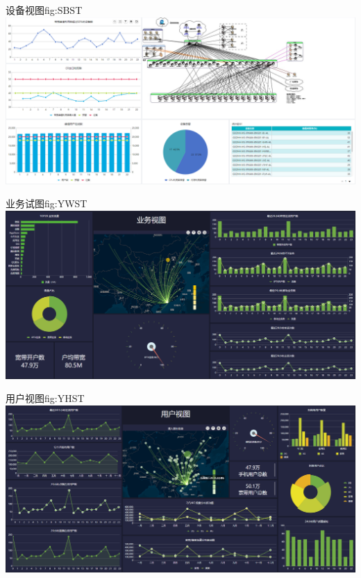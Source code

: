 \documentclass{HustGraduPaper}
\begin{document}
    \begin{generalfig}{设备视图}{fig:SBST} 
        \includegraphics[width = \textwidth]{Figures/SBST.png} 
    \end{generalfig}

    \begin{generalfig}{业务试图}{fig:YWST} 
        \includegraphics[width = \textwidth]{Figures/YWST.png} 
    \end{generalfig}

    \begin{generalfig}{用户视图}{fig:YHST} 
        \includegraphics[width = \textwidth]{Figures/YHST.png} 
    \end{generalfig}
\end{document}
